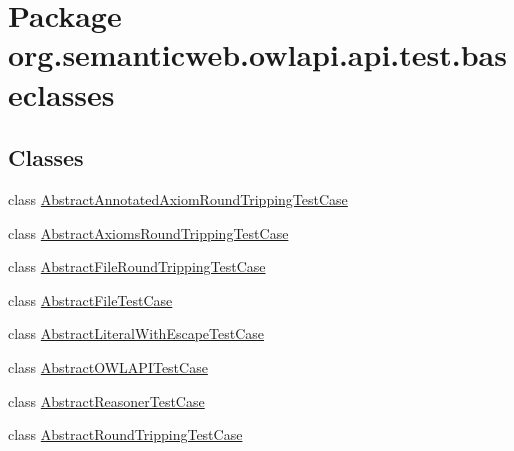 \hypertarget{namespaceorg_1_1semanticweb_1_1owlapi_1_1api_1_1test_1_1baseclasses}{\section{Package org.\-semanticweb.\-owlapi.\-api.\-test.\-baseclasses}
\label{namespaceorg_1_1semanticweb_1_1owlapi_1_1api_1_1test_1_1baseclasses}
}
\subsection*{Classes}
\begin{DoxyCompactItemize}
\item 
class \hyperlink{classorg_1_1semanticweb_1_1owlapi_1_1api_1_1test_1_1baseclasses_1_1_abstract_annotated_axiom_round_tripping_test_case}{Abstract\-Annotated\-Axiom\-Round\-Tripping\-Test\-Case}
\item 
class \hyperlink{classorg_1_1semanticweb_1_1owlapi_1_1api_1_1test_1_1baseclasses_1_1_abstract_axioms_round_tripping_test_case}{Abstract\-Axioms\-Round\-Tripping\-Test\-Case}
\item 
class \hyperlink{classorg_1_1semanticweb_1_1owlapi_1_1api_1_1test_1_1baseclasses_1_1_abstract_file_round_tripping_test_case}{Abstract\-File\-Round\-Tripping\-Test\-Case}
\item 
class \hyperlink{classorg_1_1semanticweb_1_1owlapi_1_1api_1_1test_1_1baseclasses_1_1_abstract_file_test_case}{Abstract\-File\-Test\-Case}
\item 
class \hyperlink{classorg_1_1semanticweb_1_1owlapi_1_1api_1_1test_1_1baseclasses_1_1_abstract_literal_with_escape_test_case}{Abstract\-Literal\-With\-Escape\-Test\-Case}
\item 
class \hyperlink{classorg_1_1semanticweb_1_1owlapi_1_1api_1_1test_1_1baseclasses_1_1_abstract_o_w_l_a_p_i_test_case}{Abstract\-O\-W\-L\-A\-P\-I\-Test\-Case}
\item 
class \hyperlink{classorg_1_1semanticweb_1_1owlapi_1_1api_1_1test_1_1baseclasses_1_1_abstract_reasoner_test_case}{Abstract\-Reasoner\-Test\-Case}
\item 
class \hyperlink{classorg_1_1semanticweb_1_1owlapi_1_1api_1_1test_1_1baseclasses_1_1_abstract_round_tripping_test_case}{Abstract\-Round\-Tripping\-Test\-Case}
\end{DoxyCompactItemize}
